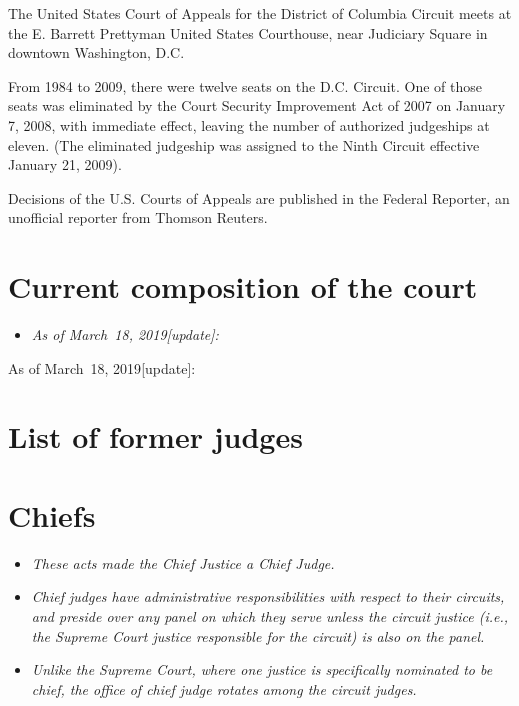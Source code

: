 The United States Court of Appeals for the District of Columbia Circuit
meets at the E. Barrett Prettyman United States Courthouse, near
Judiciary Square in downtown Washington, D.C.

From 1984 to 2009, there were twelve seats on the D.C. Circuit. One of
those seats was eliminated by the Court Security Improvement Act of 2007
on January 7, 2008, with immediate effect, leaving the number of
authorized judgeships at eleven. (The eliminated judgeship was assigned
to the Ninth Circuit effective January 21, 2009).

Decisions of the U.S. Courts of Appeals are published in the Federal
Reporter, an unofficial reporter from Thomson Reuters.

\section{Current composition of the
court}\label{current-composition-of-the-court}

\begin{itemize}
\item
  \emph{As of March~18, 2019{[}update{]}:}
\end{itemize}

As of March~18, 2019{[}update{]}:

\section{List of former judges}\label{list-of-former-judges}

\section{Chiefs}\label{chiefs}

\begin{itemize}
\item
  \emph{These acts made the Chief Justice a Chief Judge.}
\item
  \emph{Chief judges have administrative responsibilities with respect
  to their circuits, and preside over any panel on which they serve
  unless the circuit justice (i.e., the Supreme Court justice
  responsible for the circuit) is also on the panel.}
\item
  \emph{Unlike the Supreme Court, where one justice is specifically
  nominated to be chief, the office of chief judge rotates among the
  circuit judges.}
\end{itemize}

